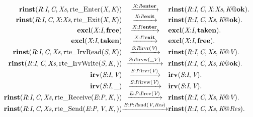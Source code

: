 \[
\begin{array}{r@{}c@{}l}
\\\Pfact{\Tstep{\Trinst{\Tr{\Tvar{R}}{\Tvar{I}}}{\Tvar{C}}{\Tvar{Xs}}{\TrteEnter{\Tvar{X}}{\Tvar{K}}}}{\Tsay{\Tx{\Tvar{X}}{\Tvar{I}}}{\Tatom{enter}}}{\Trinst{\Tr{\Tvar{R}}{\Tvar{I}}}{\Tvar{C}}{\Tcons{\Tvar{X}}{\Tvar{Xs}}}{\Tap{\Tvar{K}}{\Tatom{ok}}}}}.
\\\Pfact{\Tstep{\Trinst{\Tr{\Tvar{R}}{\Tvar{I}}}{\Tvar{C}}{\Tcons{\Tvar{X}}{\Tvar{Xs}}}{\TrteExit{\Tvar{X}}{\Tvar{K}}}}{\Tsay{\Tx{\Tvar{X}}{\Tvar{I}}}{\Tatom{exit}}}{\Trinst{\Tr{\Tvar{R}}{\Tvar{I}}}{\Tvar{C}}{\Tvar{Xs}}{\Tap{\Tvar{K}}{\Tatom{ok}}}}}.
\\\Pfact{\Tstep{\Texcl{\Tx{\Tvar{X}}{\Tvar{I}}}{\Tatom{free}}}{\Thear{\Tx{\Tvar{X}}{\Tvar{I}}}{\Tatom{enter}}}{\Texcl{\Tx{\Tvar{X}}{\Tvar{I}}}{\Tatom{taken}}}}.
\\\Pfact{\Tstep{\Texcl{\Tx{\Tvar{X}}{\Tvar{I}}}{\Tatom{taken}}}{\Thear{\Tx{\Tvar{X}}{\Tvar{I}}}{\Tatom{exit}}}{\Texcl{\Tx{\Tvar{X}}{\Tvar{I}}}{\Tatom{free}}}}.
\\\Pfact{\Tstep{\Trinst{\Tr{\Tvar{R}}{\Tvar{I}}}{\Tvar{C}}{\Tvar{Xs}}{\TrteIrvRead{\Tvar{S}}{\Tvar{K}}}}{\Tsay{\Ts{\Tvar{S}}{\Tvar{I}}}{\Tirvr{\Tvar{V}}}}{\Trinst{\Tr{\Tvar{R}}{\Tvar{I}}}{\Tvar{C}}{\Tvar{Xs}}{\Tap{\Tvar{K}}{\Tvar{V}}}}}.
\\\Pfact{\Tstep{\Trinst{\Tr{\Tvar{R}}{\Tvar{I}}}{\Tvar{C}}{\Tvar{Xs}}{\TrteIrvWrite{\Tvar{S}}{\Tvar{K}}}}{\Tsay{\Ts{\Tvar{S}}{\Tvar{I}}}{\Tirvw{\_V}}}{\Trinst{\Tr{\Tvar{R}}{\Tvar{I}}}{\Tvar{C}}{\Tvar{Xs}}{\Tap{\Tvar{K}}{\Tatom{ok}}}}}.
\\\Pfact{\Tstep{\Tirv{\Ts{\Tvar{S}}{\Tvar{I}}}{\Tvar{V}}}{\Thear{\Ts{\Tvar{S}}{\Tvar{I}}}{\Tirvr{\Tvar{V}}}}{\Tirv{\Ts{\Tvar{S}}{\Tvar{I}}}{\Tvar{V}}}}.
\\\Pfact{\Tstep{\Tirv{\Ts{\Tvar{S}}{\Tvar{I}}}{\_}}{\Thear{\Ts{\Tvar{S}}{\Tvar{I}}}{\Tirvw{\Tvar{V}}}}{\Tirv{\Ts{\Tvar{S}}{\Tvar{I}}}{\Tvar{V}}}}.
\\\Pfact{\Tstep{\Trinst{\Tr{\Tvar{R}}{\Tvar{I}}}{\Tvar{C}}{\Tvar{Xs}}{\TrteReceive{\Te{\Tvar{E}}{\Tvar{P}}}{\Tvar{K}}}}{\Tsay{\Tep{\Tvar{E}}{\Tvar{P}}{\Tvar{I}}}{\Trcv{\Tvar{V}}}}{\Trinst{\Tr{\Tvar{R}}{\Tvar{I}}}{\Tvar{C}}{\Tvar{Xs}}{\Tap{\Tvar{K}}{\Tvar{V}}}}}.
\\\Pfact{\Tstep{\Trinst{\Tr{\Tvar{R}}{\Tvar{I}}}{\Tvar{C}}{\Tvar{Xs}}{\TrteSend{\Te{\Tvar{E}}{\Tvar{P}}}{\Tvar{V}}{\Tvar{K}}}}{\Tsay{\Tep{\Tvar{E}}{\Tvar{P}}{\Tvar{I}}}{\Tsnd{\Tvar{V}}{\Tvar{Res}}}}{\Trinst{\Tr{\Tvar{R}}{\Tvar{I}}}{\Tvar{C}}{\Tvar{Xs}}{\Tap{\Tvar{K}}{\Tvar{Res}}}}}.

\end{array}\]
